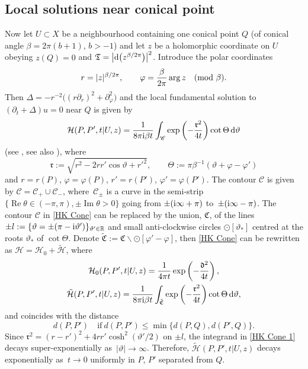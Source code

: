 \documentclass[pdftex]{sigma}
\numberwithin{equation}{section}
\theoremstyle{definition}
\begin{document}
\subsection*{Local solutions near conical point} Now let $U\subset X$ be a neighbourhood containing one conical point $Q$ (of conical angle $\beta=2\pi({b+1})$, $b>-1$) and let $z$ be a holomorphic coordinate on $U$ obeying $z(Q)=0$ and $\mathfrak{T}=\big|{\rm d}\bigl(z^{\beta/2\pi}\bigr)\big|^2$. Introduce the polar coordinates
\begin{equation}
\label{polar coordinates}
r=|z|^{\beta/2\pi}, \qquad \varphi=\frac{\beta}{2\pi}\operatorname{arg}z \quad ({\rm mod}\ \beta).
\end{equation}
Then $\Delta=-r^{-2}\bigl((r\partial_r)^2+\partial_{\varphi}^2\bigr)$ and the local fundamental solution to $(\partial_t+\Delta)u=0$ near $Q$ is given by
\begin{equation}
\label{HK Cone}
\mathcal{H}(P,P',t|U,z)=\frac{1}{8\pi {\rm i} \beta t}\int_{\mathscr{C}}\exp\left(-\frac{\mathfrak{r}^2}{4t}\right)\operatorname{cot}\Theta \, {\rm d}\vartheta
\end{equation}
(see \cite{Carslaw}, see also \cite{Dowker,KokKorJDG}), where
\begin{equation}\label{rtheta}
\mathfrak{r}:=\sqrt{r^2-2rr'\cos \vartheta+r'^{2}}, \qquad \Theta:=\pi\beta^{-1}(\vartheta+\varphi-\varphi')
\end{equation}
and $r=r(P)$, $\varphi=\varphi(P)$, $r'=r(P')$, $\varphi'=\varphi(P')$. The contour $\mathscr{C}$ is given by $\mathscr{C}=\mathscr{C}_+\cup\mathscr{C}_-$, where~$\mathscr{C}_\pm$ is a curve in the semi-strip $\{\operatorname{Re}\theta\in(-\pi,\pi),\pm\operatorname{Im}\theta>0\}$ going from $\pm ({\rm i}\infty+\pi)$ to~${\pm({\rm i}\infty-\pi)}$. The contour $\mathscr{C}$ in \eqref{HK Cone} can be replaced by the union, $\mathfrak{C}$, of the lines $\pm l:=\{\vartheta=\pm(\pi-{\rm i}\vartheta')\}_{\vartheta'\in\mathbb{R}}$ and small anti-clockwise circles $\odot[\vartheta_*]$ centred at the roots $\vartheta_*$ of $\operatorname{cot}\Theta$. Denote $\tilde{\mathfrak{C}}:=\mathfrak{C}\backslash\odot[\varphi'-\varphi]$, then \eqref{HK Cone} can be rewritten as $\mathcal{H}=\mathcal{H}_0+\tilde{\mathcal{H}}$, where
\begin{gather}
\mathcal{H}_0(P,P',t|U,z)=\frac{1}{4\pi t}\exp\left(-\frac{\mathfrak{d}^2}{4t}\right), \nonumber\\
\tilde{\mathcal{H}}(P,P',t|U,z)=\frac{1}{8\pi {\rm i} \beta t}\int_{\tilde{\mathfrak{C}}}\exp\left(-\frac{\mathfrak{r}^2}{4t}\right)\operatorname{cot}\Theta\, {\rm d}\vartheta,\label{HK Cone 1}
\end{gather}
and  coincides with the distance
\[
d(P,P') \quad \text{if} \ d(P,P')\le \min\{d(P,Q),d(P',Q)\}.\]
 Since $\mathfrak{r}^2=(r-r')^{2}+4rr'\cosh ^2(\vartheta'/2)$ on $\pm l$, the integrand in \eqref{HK Cone 1} decays super-exponentially as~${|\vartheta|\to\infty}$. Therefore, $\tilde{\mathcal{H}}(P,P',t|U,z)$ decays exponentially as~${t\to 0}$ uniformly in $P$, $P'$ separated from $Q$.
\end{document}
